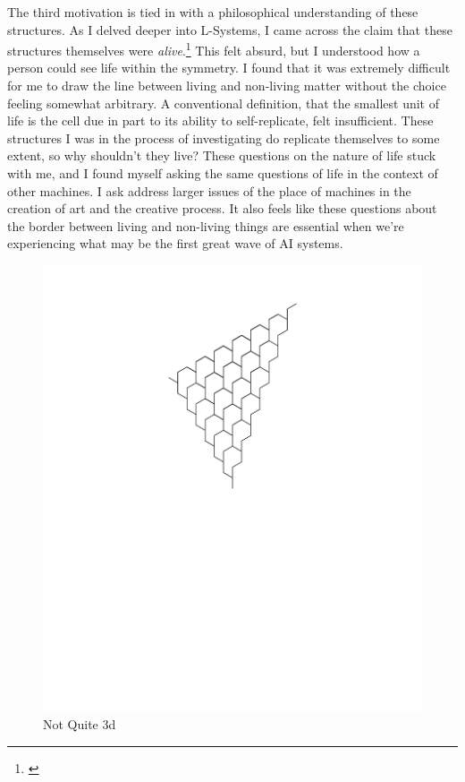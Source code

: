 \documentclass[12pt,twoside]{reedthesis}
\begin{document}
	The third motivation is tied in with a philosophical understanding of these structures. As I delved deeper into L-Systems, I came across the claim that these structures themselves were \textit{alive}.\footnote{\cite{theory2004}} This felt absurd, but I understood how a person could see life within the symmetry. I found that it was extremely difficult for me to draw the line between living and non-living matter without the choice feeling somewhat arbitrary. A conventional definition, that the smallest unit of life is the cell due in part to its ability to self-replicate, felt insufficient. These structures I was in the process of investigating do replicate themselves to some extent, so why shouldn't they live? These questions on the nature of life stuck with me, and I found myself asking the same questions of life in the context of other machines. I ask address larger issues of the place of machines in the creation of art and the creative process. It also feels like these questions about the border between living and non-living things are essential when we're experiencing what may be the first great wave of AI systems.

	\begin{figure}[h]
	\centering
	\includegraphics[clip=true, viewport=1in 6in 9in 11in, scale=0.4]{Images/ThePathWeWillFollow1}
	\caption[Not Quite 3d]{Not Quite 3d\footnotemark}
	\label {Motivations3}
	\end{figure}
\end{document}
